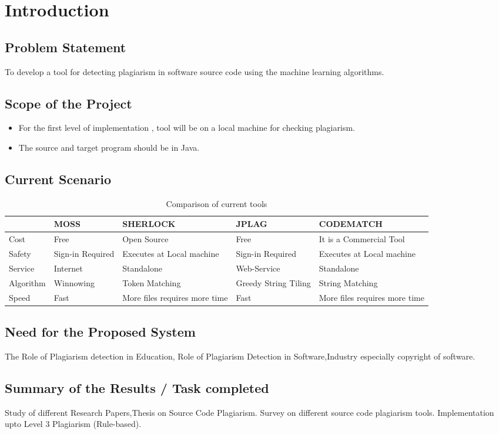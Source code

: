 \chapter{Introduction}
 \section{Problem Statement}

To develop a tool for detecting plagiarism in software source code using
the machine learning algorithms.
 \section{Scope of the Project}

 \begin{itemize}
\item For the first level of implementation , tool will be on a local machine for
checking plagiarism.
\item The source and target program should be in Java.
 \end{itemize}
 
 
 \section{Current Scenario}
\begin{table}[!htbp]
\centering
\begin{tabular}{|m{3cm}|m{3cm}|m{3cm}|m{3cm}|m{3cm}|}
\hline
          & MOSS             & SHERLOCK                      & JPLAG                & CODEMATCH                     \\ \hline
Cost      & Free             & Open Source                   & Free                 & It is a Commercial Tool       \\ \hline
Safety    & Sign-in Required & Executes at Local machine     & Sign-in Required     & Executes at Local machine     \\ \hline
Service   & Internet         & Standalone                    & Web-Service          & Standalone                    \\ \hline
Algorithm & Winnowing         & Token Matching                & Greedy String Tiling & String Matching               \\ \hline
Speed     & Fast             & More files requires more time & Fast                 & More files requires more time \\ \hline
\end{tabular}
\caption{Comparison of current tools}
\end{table}
 \section{Need for the Proposed System}
The Role of Plagiarism detection in Education, Role of Plagiarism Detection in Software,Industry especially copyright of software.
 \section{Summary of the Results / Task completed }
Study of different Research Papers,Thesis on Source Code Plagiarism.
Survey on different source code plagiarism tools.
Implementation upto Level 3 Plagiarism (Rule-based).
